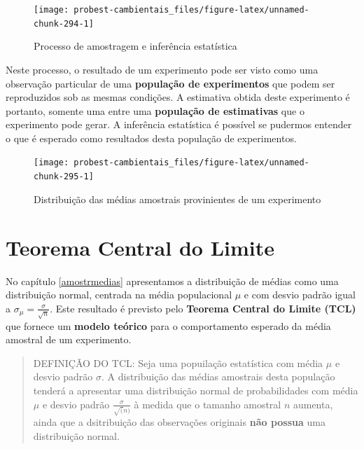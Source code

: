 \documentclass[
]{book}
\begin{document}
\begin{figure}

{\centering \texttt{[image: probest-cambientais\_files/figure-latex/unnamed-chunk-294-1]} 

}

\caption{Processo de amostragem e inferência estatística}\label{fig:unnamed-chunk-294}
\end{figure}

Neste processo, o resultado de um experimento pode ser visto como uma observação particular de uma \textbf{população de experimentos} que podem ser reproduzidos sob as mesmas condições. A estimativa obtida deste experimento é portanto, somente uma entre uma \textbf{população de estimativas} que o experimento pode gerar. A inferência estatística é possível se pudermos entender o que é esperado como resultados desta população de experimentos.

\begin{figure}

{\centering \texttt{[image: probest-cambientais\_files/figure-latex/unnamed-chunk-295-1]} 

}

\caption{Distribuição das médias amostrais provinientes de um experimento}\label{fig:unnamed-chunk-295}
\end{figure}

\hypertarget{teorema-central-do-limite}{%
\section{Teorema Central do Limite}\label{teorema-central-do-limite}}

No capítulo \ref{amostrmedias} apresentamos a distribuição de médias como uma distribuição normal, centrada na média populacional \(\mu\) e com desvio padrão igual a \(\sigma_{\mu} = \frac{\sigma}{\sqrt{n}}\). Este resultado é previsto pelo \textbf{Teorema Central do Limite (TCL)} que fornece um \textbf{modelo teórico} para o comportamento esperado da média amostral de um experimento.

\begin{quote}
DEFINIÇÃO DO TCL: Seja uma popuilação estatística com média \(\mu\) e desvio padrão \(\sigma\). A distribuição das médias amostrais desta população tenderá a apresentar uma distribuição normal de probabilidades com média \(\mu\) e desvio padrão \(\frac{\sigma}{\sqrt(n)}\) à medida que o tamanho amostral \(n\) aumenta, ainda que a dsitribuição das observações originais \textbf{não possua} uma distribuição normal.
\end{quote}
\end{document}
